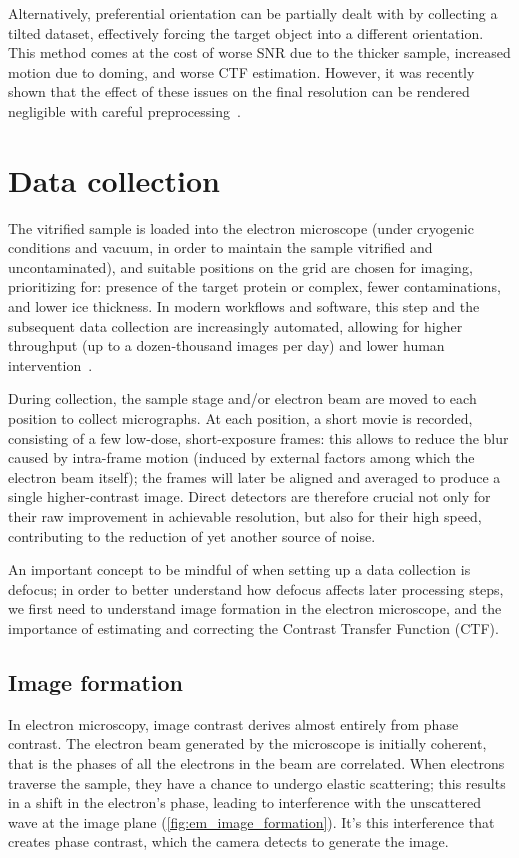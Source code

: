 Alternatively, preferential orientation can be partially dealt with by collecting a tilted dataset, effectively forcing the target object into a different orientation.
This method comes at the cost of worse SNR due to the thicker sample, increased motion due to doming, and worse CTF estimation.
However, it was recently shown that the effect of these issues on the final resolution can be rendered negligible with careful preprocessing~\cite{aiyerOvercomingResolutionAttenuation2024}.

\section{Data collection}
The vitrified sample is loaded into the electron microscope (under cryogenic conditions and vacuum, in order to maintain the sample vitrified and uncontaminated), and suitable positions on the grid are chosen for imaging, prioritizing for: presence of the target protein or complex, fewer contaminations, and lower ice thickness.
In modern workflows and software, this step and the subsequent data collection are increasingly automated, allowing for higher throughput (up to a dozen-thousand images per day) and lower human intervention~\cite{schorbSoftwareToolsAutomated2019}.

During collection, the sample stage and/or electron beam are moved to each position to collect micrographs.
At each position, a short movie is recorded, consisting of a few low-dose, short-exposure frames: this allows to reduce the blur caused by intra-frame motion (induced by external factors among which the electron beam itself); the frames will later be aligned and averaged to produce a single higher-contrast image.
Direct detectors are therefore crucial not only for their raw improvement in achievable resolution, but also for their high speed, contributing to the reduction of yet another source of noise.

An important concept to be mindful of when setting up a data collection is defocus; in order to better understand how defocus affects later processing steps, we first need to understand image formation in the electron microscope, and the importance of estimating and correcting the Contrast Transfer Function (CTF).

\subsection{Image formation}

In electron microscopy, image contrast derives almost entirely from phase contrast.
The electron beam generated by the microscope is initially coherent, that is the phases of all the electrons in the beam are correlated.
When electrons traverse the sample, they have a chance to undergo elastic scattering; this results in a shift in the electron's phase, leading to interference with the unscattered wave at the image plane (\autoref{fig:em_image_formation}).
It's this interference that creates phase contrast, which the camera detects to generate the image.

